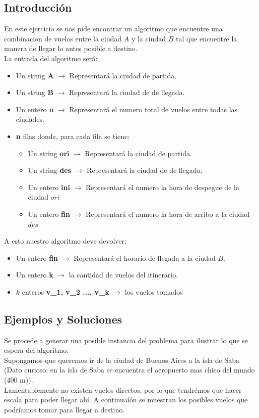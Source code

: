\subsection{Introducci\'on} 

En este ejercicio se nos pide encontrar un algoritmo que encuentre una combinacion de vuelos entre la ciudad $A$ y la ciudad $B$ tal que encuentre la manera de llegar lo antes posible a destino.
\\
La entrada del algoritmo ser\'a:

\begin{itemize}
\item Un string \textbf{A} $\rightarrow$ Representar\'a la ciudad de partida.
\item Un string \textbf{B} $\rightarrow$ Representar\'a la ciudad de de llegada.
\item Un entero \textbf{n} $\rightarrow$ Representar\'a el numero total de vuelos entre todas las ciudades.
\item \textbf{n} filas donde, para cada fila se tiene:
\begin{itemize}
\item Un string \textbf{ori} $\rightarrow$ Representar\'a la ciudad de partida.
\item Un string \textbf{des} $\rightarrow$ Representar\'a la ciudad de de llegada.
\item Un entero \textbf{ini} $\rightarrow$ Representar\'a el numero la hora de despegue de la ciudad $ori$
\item Un entero \textbf{fin} $\rightarrow$ Representar\'a el numero la hora de arribo a la ciudad $des$
\end{itemize}
\end{itemize}

A esto nuestro algoritmo deve devolver:
\begin{itemize}
\item Un entero \textbf{fin} $\rightarrow$ Representar\'a el horario de llegada a la ciudad $B$.
\item Un entero \textbf{k} $\rightarrow$ la cantidad de vuelos del itinerario.
\item $k$ enteros \textbf{v_1, v_2 ..., v_k} $\rightarrow$ los vuelos tomados
\end{itemize}

\subsection{Ejemplos y Soluciones}
Se procede a generar una posible instancia del problema para ilustrar lo que se espera del algoritmo.
\\
Supongamos que queremos ir de la ciudad de Buenos Aires a la isla de Saba (Dato curioso: en la isla de Saba se encuentra el aeropuerto mas chico del mundo (400 m)).
\\
Lamentablemente no existen vuelos directos, por lo que tendrémos que hacer escala para poder llegar ahí. A continuaíón se muestran los posibles vuelos que podríamos tomar para llegar a destino.

